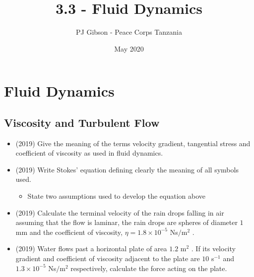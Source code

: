 \documentclass{article}
\title{3.3 - Fluid Dynamics}
\author{PJ Gibson - Peace Corps Tanzania}
\date{May 2020}
\begin{document}
\maketitle


\section{Fluid Dynamics}

\subsection{Viscosity and Turbulent Flow}
\begin{itemize}
\item (2019)  Give the meaning of the terms velocity gradient, tangential stress and coefficient of viscosity as used in fluid dynamics.
\item (2019)  Write Stokes’ equation defining clearly the meaning of all symbols used.
 \begin{itemize}
\item State two assumptions used to develop the equation above
\end{itemize}
\item (2019)  Calculate the terminal velocity of the rain drops falling in air assuming that the flow is laminar, the rain drops are spheres of diameter $ 1$ mm and the coefficient of viscosity, $ \eta =1.8 \times 10^{-5}$ Ns$/$m$ ^{2}$ . 
\item (2019)  Water flows past a horizontal plate of area $ 1.2$ m$ ^{2}$ . If its velocity gradient and coefficient of viscosity adjacent to the plate are $ 10$ s$ ^{-1}$ and $ 1.3 \times 10^{-5}$ Ns$/$m$ ^{2}$ respectively, calculate the force acting on the plate.  
\end{itemize}
\end{document}
